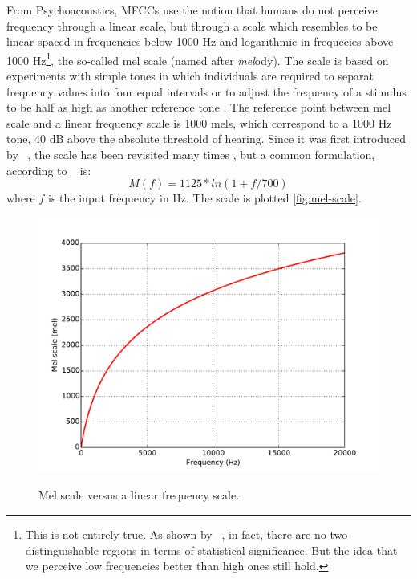 From Psychoacoustics, \ac{MFCC}s use the notion that humans do not perceive frequency through a linear scale, but through a scale which resembles to be linear-spaced in frequencies below 1000 Hz and logarithmic in frequecies above 1000 Hz\footnote{This is not entirely true. As shown by \citeauthor{Umesh1999}~\cite{Umesh1999}, in fact, there are no two distinguishable regions in terms of statistical significance. But the idea that we perceive low frequencies better than high ones still hold.}, the so-called mel scale (named after \emph{mel}ody). The scale is based on experiments with simple tones in which individuals are required to separat frequency values into four equal intervals or to adjust the frequency of a stimulus to be half as high as another reference tone \cite{Huang2001}. The reference point between mel scale and a linear frequency scale is 1000 mels, which correspond to a 1000 Hz tone, 40 dB above the absolute threshold of hearing. Since it was first introduced by \citeauthor{Stevens1937}~\cite{Stevens1937}, the scale has been revisited many times \cite{Umesh1999}, but a common formulation, according to \citeauthor{Huang2001}~\cite{Huang2001} is:
\begin{equation}
 M(f) = 1125*ln(1 + f / 700)
\end{equation}
where $f$ is the input frequency in Hz. The scale is plotted \autoref{fig:mel-scale}.
\begin{figure}[!ht]
        \myfloatalign
        {\includegraphics[width=1.\linewidth]{gfx/mel-scale.pdf}}
        \caption{Mel scale versus a linear frequency scale.}\label{fig:mel-scale}
\end{figure}

